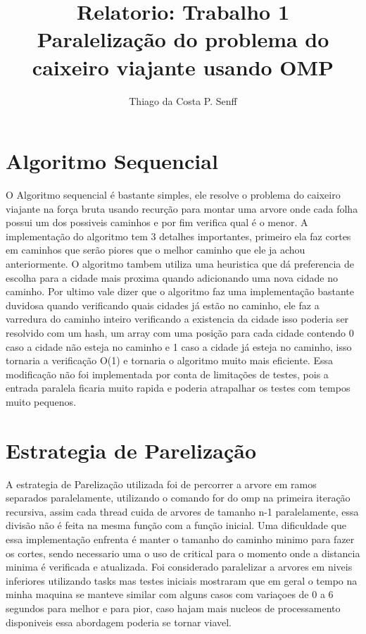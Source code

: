 \documentclass[a4paper,12pt]{article}
\author{Thiago da Costa P. Senff}
\title{Relatorio: Trabalho 1 \\ \large Paralelização do problema do caixeiro viajante usando OMP}
\begin{document}
    \maketitle
    \newpage

    \tableofcontents
    \newpage
    
    \section{Algoritmo Sequencial}
        O Algoritmo sequencial é bastante simples, ele resolve o problema
        do caixeiro viajante na força bruta usando recurção para montar uma arvore onde cada
        folha possui um dos possiveis caminhos e por fim verifica qual é o menor. A implementação do
        algoritmo tem 3 detalhes importantes, primeiro ela faz cortes em caminhos que serão piores que o melhor caminho que ele ja achou anteriormente.
        O algoritmo tambem utiliza uma heuristica que dá preferencia de escolha para a cidade mais proxima
        quando adicionando uma nova cidade no caminho. Por ultimo vale dizer que o algoritmo faz uma implementação bastante
        duvidosa quando verificando quais cidades já estão no caminho, ele faz a varredura do caminho inteiro verificando a existencia da cidade
        isso poderia ser resolvido com um hash, um array com uma posição para cada cidade contendo 0 caso a cidade não esteja no caminho
        e 1 caso a cidade já esteja no caminho, isso tornaria a verificação O(1) e tornaria o algoritmo muito mais eficiente.
        Essa modificação não foi implementada por conta de limitações de testes, pois a entrada paralela ficaria muito rapida e poderia atrapalhar os testes com tempos muito pequenos.

    \section{Estrategia de Parelização}
        A estrategia de Parelização utilizada foi de percorrer a arvore em ramos separados paralelamente, utilizando o comando for do omp
        na primeira iteração recursiva, assim cada thread cuida de arvores de tamanho n-1 paralelamente, essa divisão não é feita na mesma função com a função inicial.
        Uma dificuldade que essa implementação enfrenta é manter o tamanho do caminho minimo para fazer os cortes, sendo necessario uma 
        o uso de critical para o momento onde a distancia minima é verificada e atualizada. Foi considerado paralelizar a arvores em niveis 
        inferiores utilizando tasks mas testes iniciais mostraram que em geral o tempo na minha maquina se manteve similar com alguns casos 
        com variaçoes de 0 a 6 segundos para melhor e para pior, caso hajam mais nucleos de processamento disponiveis essa abordagem poderia se tornar viavel.
\end{document}
